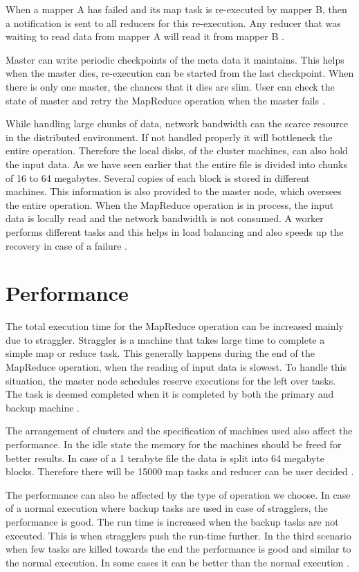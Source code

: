 \documentclass[sigconf]{acmart}
\begin{document}
When a mapper A has failed and its map task is re-executed by mapper B, then a notification is sent to all reducers for this re-execution. Any reducer that was waiting to read data from mapper A will read it from mapper B \cite{rf2}. 

Master can write periodic checkpoints of the meta data it maintains. This helps when the master dies, re-execution can be started from the last checkpoint. When there is only one master, the chances that it dies are slim. User can check the state of master and retry the MapReduce operation when the master fails \cite{rf2}.

While handling large chunks of data, network bandwidth can the scarce resource in the distributed environment. If not handled properly it will bottleneck the entire operation. Therefore the local disks, of the cluster machines, can also hold the input data. As we have seen earlier that the entire file is divided into chunks of 16 to 64 megabytes. Several copies of each block is stored in different machines. This information is also provided to the master node, which oversees the entire operation. When the MapReduce operation is in process, the input data is locally read and the network bandwidth is not consumed. A worker performs different tasks and this helps in load balancing and also speeds up the recovery in case of a failure \cite{rf2}.  
\section{Performance}
The total execution time for the MapReduce operation can be increased mainly due to straggler. Straggler is a machine that takes large time to complete a simple map or reduce task. This generally happens during the end of the MapReduce operation, when the reading of input data is slowest. To handle this situation, the master node schedules reserve executions for the left over tasks. The task is deemed completed when it is completed by both the  primary and backup machine  \cite{rf2}. 

 The arrangement of clusters and the specification of machines used also affect the performance. In the idle state the memory for the machines should be freed for better results. In case of a 1 terabyte file the data is split into 64 megabyte blocks. Therefore there will be 15000 map tasks and reducer can be user decided \cite{rf2}. 

The performance can also be affected by the type of operation we choose. In case of a normal execution where backup tasks are used in case of stragglers, the performance is good. The run time is increased when the backup tasks are not executed. This is when stragglers push the run-time further. In the third scenario when few tasks are killed towards the end the performance is good and similar to the normal execution. In some cases it can be better than the normal execution \cite{rf2}.  
\end{document}

